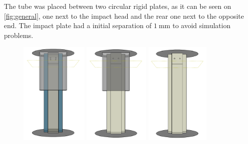 \documentclass[cmfonts]{witpress}
\begin{document}
The tube was placed between two circular rigid plates, as it can be seen on \cref{fig:general}, one next to the impact head and the rear one next to the opposite end. The impact plate had a initial separation of $\SI{1}{\mm}$ to avoid simulation problems.

\begin{figure}
	\centering
	\begin{minipage}[b]{.22\linewidth}
		\centering
		\includegraphics[height=5cm]{figures/IMG_CUTRES/general_transp}
	\end{minipage}
	\quad
	\begin{minipage}[b]{.22\linewidth}
		\centering
		\includegraphics[height=5cm]{figures/IMG_CUTRES/general_rigtransp}
	\end{minipage}
	\quad
	\begin{minipage}[b]{.22\linewidth}
		\centering
		\includegraphics[height=5cm]{figures/IMG_CUTRES/general_noSb}
	\end{minipage}
	\quad
	\begin{minipage}[b]{.22\linewidth}

\end{minipage}
\end{figure}
\end{document}
